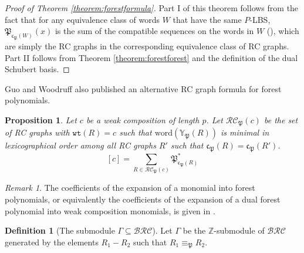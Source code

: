 \documentclass{amsart}
\newtheorem{proposition}[lemma]{Proposition}
\theoremstyle{definition}
\newtheorem{definition}[lemma]{Definition}
\theoremstyle{remark}
\newtheorem*{remark}{Remark}
\numberwithin{equation}{subsection}
\newcommand{\wtt}{\mathtt{wt}}
\newcommand{\BRC}{\mathcal{BRC}}
\newcommand{\RC}{\mathcal{RC}}
\newcommand{\code}{\mathfrak{c}}
\newcommand{\forest}{\mathfrak{P}}
\begin{document}
\begin{proof}[Proof of Theorem \ref{theorem:forestformula}]
  Part I of this theorem follows from the fact that for any equivalence class of words $W$ that have the same $P$-LBS, $\forest_{\code_\forest(W)}(x)$ is the sum of the compatible sequences on the words in $W$ (\cite[Proposition~5.10]{nadeau2024forest}), which are simply the RC graphs in the corresponding equivalence class of RC graphs. Part II follows from Theorem \ref{theorem:forestforest} and the definition of the dual Schubert basis.
\end{proof}

Guo and Woodruff \cite{guo2026forest} also published an alternative RC graph formula for forest polynomials.


\begin{proposition}
Let $c$ be a weak composition of length $p$. Let $\RC_\forest(c)$ be the set of RC graphs with $\wtt(R) = c$ such that $\mathrm{word}(\mathbb{Y}_\forest(R))$ is minimal in lexicographical order among all RC graphs $R'$ such that $\code_\forest(R)=\code_\forest(R')$.
$$[c] = \sum_{R\in\RC_\forest(c)} \forest_{\code_\forest(R)}^*$$
\end{proposition}

\begin{remark}
The coefficients of the expansion of a monomial into forest polynomials, or equivalently the coefficients of the expansion of a dual forest polynomial into weak composition monomials, is given in \cite[Proposition~10.15]{nadeau2024forest}.
\end{remark}

\begin{definition}[The submodule $\Gamma\subseteq \BRC$]\label{definition:gamma}
  Let $\Gamma$ be the $\mathbb{Z}$-submodule of $\BRC$ generated by the elements $R_1-R_2$ such that $R_1\equiv_\forest R_2$.

\end{definition}
\end{document}

